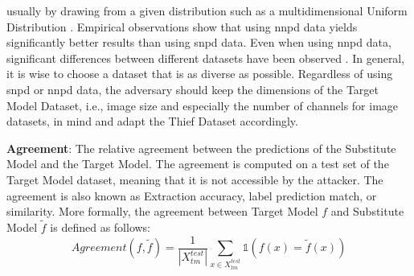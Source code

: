 usually by drawing from a given distribution such as a multidimensional Uniform Distribution \cite{pal2020activethief}. Empirical observations show that using \gls{nnpd} data
yields significantly better results than using \gls{snpd} data. Even when using \gls{nnpd} data, significant differences between different datasets have been observed 
\cite{pal2020activethief}. In general, it is wise to choose a dataset that is as diverse as possible. Regardless of using \gls{snpd} or \gls{nnpd} data, the adversary should keep the
dimensions of the Target Model Dataset, i.e., image size and especially the number of channels for image datasets, in mind and adapt the Thief Dataset accordingly. \par
\textbf{Agreement}: The relative agreement between the predictions of the Substitute Model and the Target Model. The agreement is computed on a test set of the Target 
Model dataset, meaning that it is not accessible by the attacker. The agreement is also known as Extraction accuracy, label prediction match, or similarity. More formally,
the agreement between Target Model $f$ and Substitute Model $\tilde{f}$ is defined as follows:
\begin{equation}
    Agreement(f,\tilde{f}) = \frac{1}{|X_{tm}^{test}|} \sum_{x \in X_{tm}^{test}} \mathds{1}(f(x) = \tilde{f}(x))
\end{equation}




